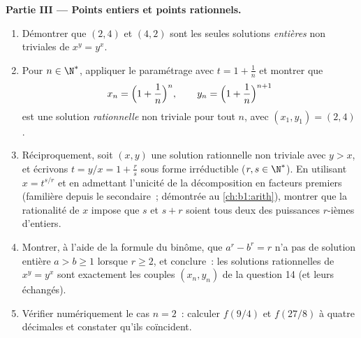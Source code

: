 \begin{problem}
\medskip
\noindent\textbf{Partie III --- Points entiers et points rationnels.}
\begin{enumerate}[resume]
  \item Démontrer que $(2, 4)$ et $(4, 2)$ sont les seules solutions
        \emph{entières} non triviales de $x^y = y^x$.
  \item Pour $n \in \N^*$, appliquer le paramétrage avec $t = 1 +
        \frac1n$ et montrer que
        \[
        x_n = \Bigl(1 + \frac1n\Bigr)^{n},
        \qquad
        y_n = \Bigl(1 + \frac1n\Bigr)^{n+1}
        \]
        est une solution \emph{rationnelle} non triviale pour tout
        $n$, avec $(x_1, y_1) = (2, 4)$.
  \item Réciproquement, soit $(x, y)$ une solution rationnelle non
        triviale avec $y > x$, et écrivons $t = y/x = 1 + \frac rs$
        sous forme irréductible ($r, s \in \N^*$). En utilisant
        $x = t^{s/r}$ et en admettant l'unicité de la décomposition
        en facteurs premiers (familière depuis le secondaire~; démontrée
        au \cref{ch:b1:arith}), montrer que la rationalité de $x$
        impose que $s$ et $s + r$ soient tous deux des puissances
        $r$-ièmes d'entiers.
  \item Montrer, à l'aide de la formule du binôme, que $a^r - b^r =
        r$ n'a pas de solution entière $a > b \geq 1$ lorsque
        $r \geq 2$, et conclure~: les solutions rationnelles de
        $x^y = y^x$ sont exactement les couples $(x_n, y_n)$ de la
        question 14 (et leurs échangés).
  \item Vérifier numériquement le cas $n = 2$~: calculer $f(9/4)$ et
        $f(27/8)$ à quatre décimales et constater qu'ils coïncident.
\end{enumerate}


\end{problem}
